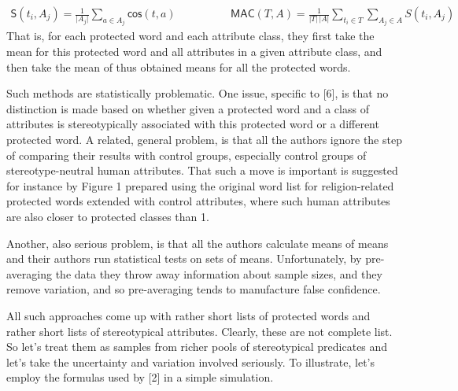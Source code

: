 \documentclass[
  12pt,
  dvipsnames,enabledeprecatedfontcommands]{scrartcl}
\begin{document}
\vspace{-2mm}

\footnotesize

\begin{align}
\mathsf{S}(t_i, A_j)  = \frac{1}{\vert A_j\vert}\sum_{a\in A_j}\mathsf{cos}(t,a) & \,\,\,\,\,\,\,\,\,\,\,\,\,\,\,\,\,\,\,\,\,\,\,\,\,
\mathsf{MAC}(T,A)  = \frac{1}{\vert T \vert \,\vert A\vert}\sum_{t_i \in T }\sum_{A_j \in A} S(t_i,A_j) \tag{MAC}
\end{align} \normalsize  \noindent That is, for each protected word and
each attribute class, they first take the mean for this protected word
and all attributes in a given attribute class, and then take the mean of
thus obtained means for all the protected words.

Such methods are statistically problematic. One issue, specific to
{[}6{]}, is that no distinction is made based on whether given a
protected word and a class of attributes is stereotypically associated
with this protected word or a different protected word. A related,
general problem, is that all the authors ignore the step of comparing
their results with control groups, especially control groups of
stereotype-neutral human attributes.
That such a move is important is suggested for instance by Figure 1
prepared using the original word list for religion-related protected
words extended with control attributes, where such human attributes are
also closer to protected classes than 1.

Another, also serious problem, is that all the authors calculate means
of means and their authors
 run statistical
tests on sets of means. Unfortunately, by pre-averaging the data they
throw away information about sample sizes, and they remove variation,
and so pre-averaging tends to manufacture false confidence.

All such approaches come up with rather short lists of protected words
and rather short lists of stereotypical attributes. Clearly, these are
not complete list. So let's treat them as samples from richer pools of
stereotypical predicates and let's take the uncertainty and variation
involved seriously. To illustrate, let's employ the formulas used by
{[}2{]} in a simple simulation.
\end{document}
